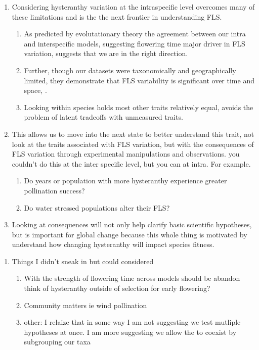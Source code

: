 \documentclass[12pt]{article}\usepackage[]{graphicx}\usepackage[]{color}
\begin{document}
\begin{enumerate}
\begin{enumerate}
\end{enumerate}
\item Considering hysteranthy variation at the intraspecific level overcomes many of these limitations  and is the the next frontier in understanding FLS.
\begin{enumerate}
\item As predicted by evolutationary theory the agreement between our intra and interspecific models, suggesting flowering time major driver in FLS variation, suggests that we are in the right direction.
\item Further, though our datasets were taxonomically and geographically limited, they demonstrate that FLS variability is significant over time and space, .
\item Looking within species holds most other traits relatively equal, avoids the problem of latent tradeoffs with unmeasured traits.
\end{enumerate}

\item  This allows us to move into the next state to better understand this trait, not look at the traits associated with FLS variation, but with the consequences of FLS variation through experimental manipulations and observations. you couldn't do this at the inter specific level, but you can at intra. For example.
\begin{enumerate}
\item Do years or population with more hysteranthy experience greater pollination success?
\item Do water stressed populations alter their FLS?

\end{enumerate}
\item Looking at consequences will not only help clarify basic scientific hypotheses, but is important for global change because this whole thing is motivated by understand how changing hysteranthy will impact species fitness.

\end{enumerate}
\begin{enumerate}
    \item Things I didn't sneak in but could considered
    \begin{enumerate}
        \item With the strength of flowering time across models should be abandon think of hysteranthy outside of selection for early flowering?
        \item Community matters ie wind pollination
        \item other: I relaize that in some way I am not suggesting we test mutliple hypotheses at once. I am more suggesting we allow the to coexist by subgrouping our taxa
    \end{enumerate}
\end{enumerate}
\end{document}
